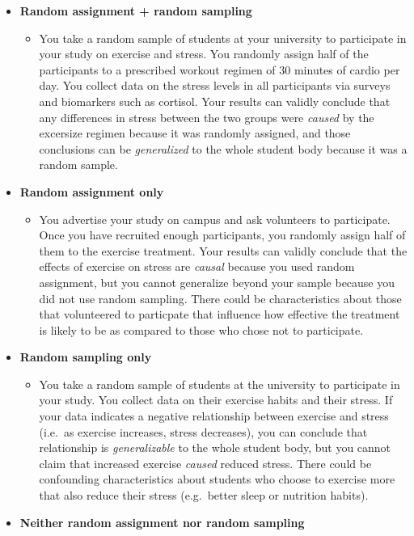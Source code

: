 \documentclass[
  letterpaper,
  DIV=11,
  numbers=noendperiod]{scrreprt}
\providecommand{\tightlist}{%
  \setlength{\itemsep}{0pt}\setlength{\parskip}{0pt}}\usepackage{longtable,booktabs,array}
\theoremstyle{definition}
\theoremstyle{remark}
\begin{document}
\begin{itemize}
\tightlist
\item
  \textbf{Random assignment + random sampling}

  \begin{itemize}
  \tightlist
  \item
    You take a random sample of students at your university to
    participate in your study on exercise and stress. You randomly
    assign half of the participants to a prescribed workout regimen of
    30 minutes of cardio per day. You collect data on the stress levels
    in all participants via surveys and biomarkers such as cortisol.
    Your results can validly conclude that any differences in stress
    between the two groups were \emph{caused} by the excersize regimen
    because it was randomly assigned, and those conclusions can be
    \emph{generalized} to the whole student body because it was a random
    sample.
  \end{itemize}
\item
  \textbf{Random assignment only}

  \begin{itemize}
  \tightlist
  \item
    You advertise your study on campus and ask volunteers to
    participate. Once you have recruited enough participants, you
    randomly assign half of them to the exercise treatment. Your results
    can validly conclude that the effects of exercise on stress are
    \emph{causal} because you used random assignment, but you cannot
    generalize beyond your sample because you did not use random
    sampling. There could be characteristics about those that
    volunteered to particpate that influence how effective the treatment
    is likely to be as compared to those who chose not to participate.
  \end{itemize}
\item
  \textbf{Random sampling only}

  \begin{itemize}
  \tightlist
  \item
    You take a random sample of students at the university to
    participate in your study. You collect data on their exercise habits
    and their stress. If your data indicates a negative relationship
    between exercise and stress (i.e.~as exercise increases, stress
    decreases), you can conclude that relationship is
    \emph{generalizable} to the whole student body, but you cannot claim
    that increased exercise \emph{caused} reduced stress. There could be
    confounding characteristics about students who choose to exercise
    more that also reduce their stress (e.g.~better sleep or nutrition
    habits).
  \end{itemize}
\item
  \textbf{Neither random assignment nor random sampling}


\end{itemize}
\end{document}
